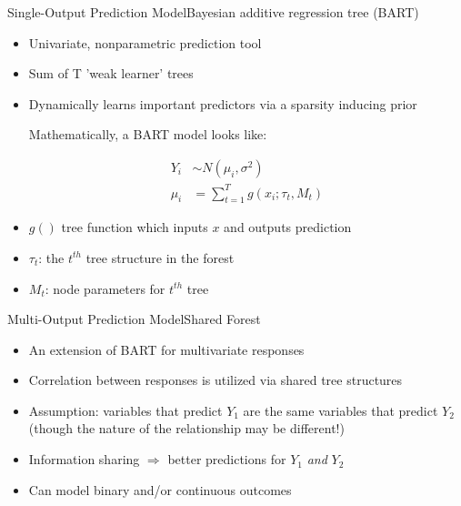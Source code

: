 \documentclass{beamer}
\begin{document}
\begin{frame}{Single-Output Prediction Model}{Bayesian additive regression tree (BART)}
\begin{itemize}
\item Univariate, nonparametric prediction tool
\item Sum of T 'weak learner' trees %
\item Dynamically learns important predictors via a sparsity inducing prior


Mathematically, a BART model looks like:

\begin{align*}
Y_i &\sim N(\mu_i, \sigma^2)\\
\mu_i &= \sum_{t=1}^T g(x_i ; \tau_t, M_t)%
\end{align*}


\item $g()$ tree function which inputs $x$ and outputs prediction
\item $\tau_t$: the $t^{th}$ tree structure in the forest 
\item $M_t$: node parameters for $t^{th}$ tree
\end{itemize}


\end{frame}

\begin{frame}{Multi-Output Prediction Model}{Shared Forest}
\begin{itemize}
\item An extension of BART for multivariate responses
\item Correlation between responses is utilized via shared tree structures
\item Assumption: variables that predict $Y_1$ are the same variables that predict $Y_2$ (though the nature of the relationship may be different!)
\item Information sharing $\Rightarrow$ better predictions for $Y_1$ \textit{and} $Y_2$ 
\item Can model binary and/or continuous outcomes
\end{itemize}
\end{frame}
\end{document}
